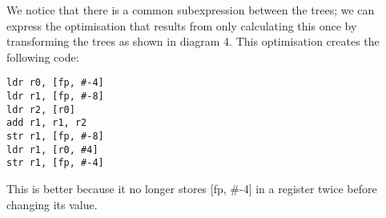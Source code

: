 We notice that there is a common subexpression between the trees; we can express the optimisation that results from only calculating this once by transforming the trees as shown in diagram 4.
This optimisation creates the following code:

\begin{lstlisting}
ldr r0, [fp, #-4]
ldr r1, [fp, #-8]
ldr r2, [r0]
add r1, r1, r2
str r1, [fp, #-8]
ldr r1, [r0, #4]
str r1, [fp, #-4]

\end{lstlisting}

This is better because it no longer stores [fp, \#-4] in a register twice before changing its value.
